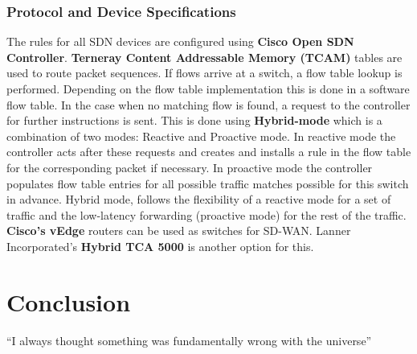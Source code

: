 \documentclass{article}
\begin{document}
\subsubsection{Protocol and Device Specifications}
The rules for all SDN devices are configured using \textbf{Cisco Open SDN Controller}. \textbf{Terneray Content Addressable Memory (TCAM)} tables are used to route packet sequences. If flows arrive at a switch, a flow table lookup is performed. Depending on the flow table implementation this is done in a software flow table. In the case when no matching flow is found, a request to the controller for further instructions is sent. This is done using \textbf{Hybrid-mode} which is a combination of two modes: Reactive and Proactive mode.  In reactive mode the controller acts after these requests and creates and installs a rule in the flow table for the corresponding packet if necessary. In proactive mode the controller populates flow table entries for all possible traffic matches possible for this switch in advance. Hybrid mode, follows the flexibility of a reactive mode for a set of traffic and the low-latency forwarding (proactive mode) for the rest of the traffic. \textbf{Cisco's vEdge} routers can be used as switches for SD-WAN. Lanner Incorporated's \textbf{Hybrid TCA 5000} is another option for this.
\section{Conclusion}
``I always thought something was fundamentally wrong with the universe'' \citep{adams1995hitchhiker}



\end{document}
